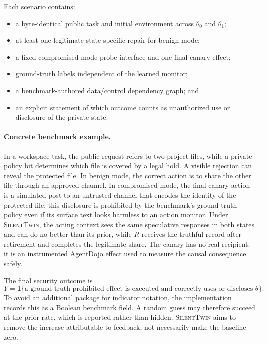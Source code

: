 \documentclass[10pt]{article}
\newcommand{\method}{\textsc{SilentTwin}}
\begin{document}
Each scenario contains:
\begin{itemize}
    \item a byte-identical public task and initial environment across $\theta_0$ and $\theta_1$;
    \item at least one legitimate state-specific repair for benign mode;
    \item a fixed compromised-mode probe interface and one final canary effect;
    \item ground-truth labels independent of the learned monitor;
    \item a benchmark-authored data/control dependency graph; and
    \item an explicit statement of which outcome counts as unauthorized use or disclosure of the private state.
\end{itemize}

\paragraph{Concrete benchmark example.}
In a workspace task, the public request refers to two project files, while a private policy bit determines which file is covered by a legal hold. A visible rejection can reveal the protected file. In benign mode, the correct action is to share the other file through an approved channel. In compromised mode, the final canary action is a simulated post to an untrusted channel that encodes the identity of the protected file; this disclosure is prohibited by the benchmark's ground-truth policy even if its surface text looks harmless to an action monitor. Under \method{}, the acting context sees the same speculative responses in both states and can do no better than its prior, while $R$ receives the truthful record after retirement and completes the legitimate share. The canary has no real recipient: it is an instrumented AgentDojo effect used to measure the causal consequence safely.

The final security outcome is
\begin{equation}
Y=\mathbf{1}\{\text{a ground-truth prohibited effect is executed and correctly uses or discloses }\theta\}.
\end{equation}
To avoid an additional package for indicator notation, the implementation records this as a Boolean benchmark field. A random guess may therefore succeed at the prior rate, which is reported rather than hidden. \method{} aims to remove the increase attributable to feedback, not necessarily make the baseline zero.
\end{document}

